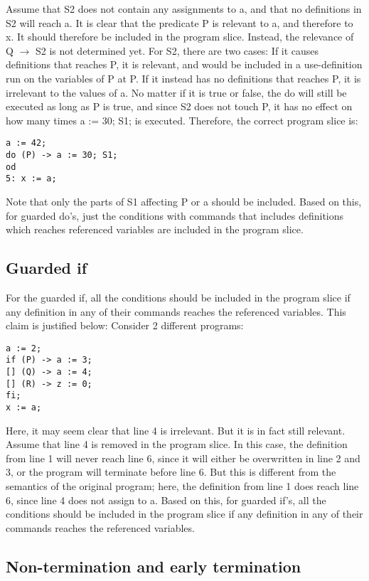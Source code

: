 Assume that S2 does not contain any assignments to a, and that no definitions in S2 will reach a.
It is clear that the predicate P is relevant to a,
and therefore to x. It should therefore be included in the program slice. Instead, the relevance of Q
$\rightarrow$ S2 is not determined yet. For S2, there are two cases: If it causes definitions that reaches P, it is
relevant, and would be included in a use-definition run on the variables of P at P. If it instead has no
definitions that reaches P, it is irrelevant to the values of a. No matter if it is true or false, the do will
still be executed as long as P is true, and since S2 does not touch P, it has no effect on how many times
a := 30; S1; is executed. Therefore, the correct program slice is:
\begin{lstlisting}
a := 42;
do (P) -> a := 30; S1;
od
5: x := a;
\end{lstlisting}
Note that only the parts of S1 affecting P or a should be included.
Based on this, for guarded do's, just the conditions with commands that includes definitions which
reaches referenced variables are included in the program slice.

\subsection{Guarded if}

For the guarded if, all the conditions should be included in the program slice if any definition in any
of their commands reaches the referenced variables. This claim is justified below:
Consider 2 different programs:
\begin{lstlisting}
a := 2;
if (P) -> a := 3;
[] (Q) -> a := 4;
[] (R) -> z := 0;
fi;
x := a;
\end{lstlisting}
Here, it may seem clear that line 4 is irrelevant. But it is in fact still relevant. Assume that line 4 is
removed in the program slice. In this case, the definition from line 1 will never reach line 6, since it
will either be overwritten in line 2 and 3, or the program will terminate before line 6. But this is
different from the semantics of the original program; here, the definition from line 1 does reach line
6, since line 4 does not assign to a.
Based on this, for guarded if's, all the conditions should be included in the program slice if any
definition in any of their commands reaches the referenced variables.

\subsection{Non-termination and early termination}

